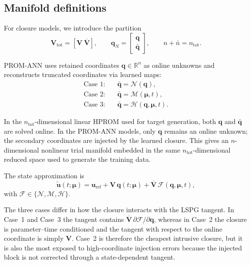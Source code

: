 \documentclass[11pt]{article}
\begin{document}
\subsection{Manifold definitions}
For closure models, we introduce the partition
\begin{equation}
\mathbf V_{\mathrm{tot}}=[\mathbf V\ \overline{\mathbf V}],
\qquad
\mathbf q_N=
\begin{bmatrix}
\mathbf q\\
\bar{\mathbf q}
\end{bmatrix},
\qquad
n+\bar n=n_{\mathrm{tot}}.
\end{equation}

PROM-ANN uses retained coordinates $\mathbf q\in\mathbb R^n$ as online unknowns and reconstructs truncated coordinates via learned maps:
\begin{align}
\text{Case 1:}&\quad \bar{\mathbf q}=\mathcal N(\mathbf q),\\
\text{Case 2:}&\quad \bar{\mathbf q}=\mathcal M(\bm\mu,t),\\
\text{Case 3:}&\quad \bar{\mathbf q}=\mathcal H(\mathbf q,\bm\mu,t).
\end{align}

In the $n_{\mathrm{tot}}$-dimensional linear HPROM used for target generation,
both $\mathbf q$ and $\bar{\mathbf q}$ are solved online. In the PROM-ANN
models, only $\mathbf q$ remains an online unknown; the secondary coordinates
are injected by the learned closure. This gives an $n$-dimensional nonlinear
trial manifold embedded in the same $n_{\mathrm{tot}}$-dimensional reduced
space used to generate the training data.

The state approximation is
\begin{equation}
\tilde{\mathbf u}(t;\bm\mu)
=
\mathbf u_{\mathrm{ref}}+
\mathbf V\,\mathbf q(t;\bm\mu)+
\overline{\mathbf V}\,\mathcal F(\mathbf q,\bm\mu,t),
\label{eq:ann-manifold}
\end{equation}
with $\mathcal F\in\{\mathcal N,\mathcal M,\mathcal H\}$.

The three cases differ in how the closure interacts with the LSPG tangent. In
Case~1 and Case~3 the tangent contains
$\overline{\mathbf V}\,\partial\mathcal F/\partial\mathbf q$, whereas in
Case~2 the closure is parameter--time conditioned and the tangent with respect
to the online coordinate is simply $\mathbf V$. Case~2 is therefore the
cheapest intrusive closure, but it is also the most exposed to high-coordinate
injection errors because the injected block is not corrected through a
state-dependent tangent.
\end{document}
